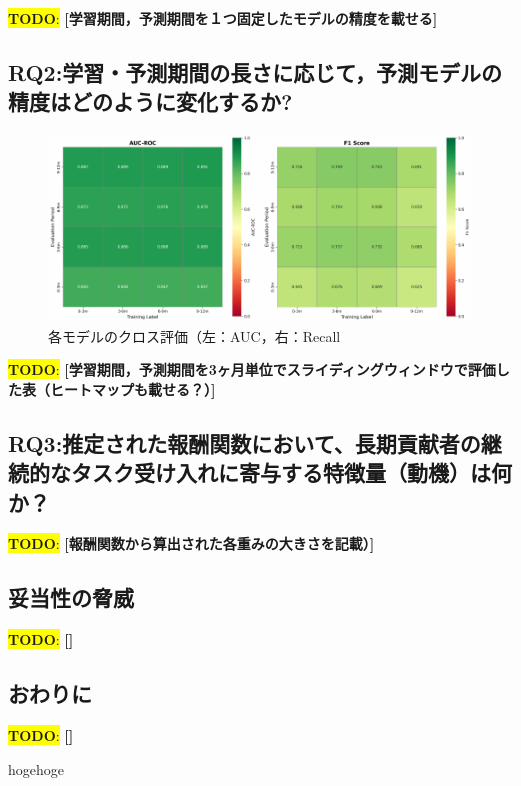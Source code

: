 \documentclass[submit,techrep,noauthor]{ipsj}
\newcommand{\todo}[1]{\colorbox{yellow}{{\bf TODO}:}{\color{red} {\textbf{[#1]}}}}
\begin{document}
\todo{学習期間，予測期間を１つ固定したモデルの精度を載せる}

\subsection{RQ2:学習・予測期間の長さに応じて，予測モデルの精度はどのように変化するか?}
\begin{figure}[t]
    \centering
    \includegraphics[width=0.8\linewidth]{./Hashimoto_fig/heatmap_conbined.pdf}
    \caption{各モデルのクロス評価（左：AUC，右：Recall}
    \label{fig:Approach}
\end{figure}


\todo{学習期間，予測期間を3ヶ月単位でスライディングウィンドウで評価した表（ヒートマップも載せる？）}
\subsection{RQ3:推定された報酬関数において、長期貢献者の継続的なタスク受け入れに寄与する特徴量（動機）は何か？}
\todo{報酬関数から算出された各重みの大きさを記載）}

\subsection{妥当性の脅威}
\todo{}

\subsection{おわりに}
\todo{}

\begin{acknowledgment}
hogehoge
\end{acknowledgment}




\end{document}
